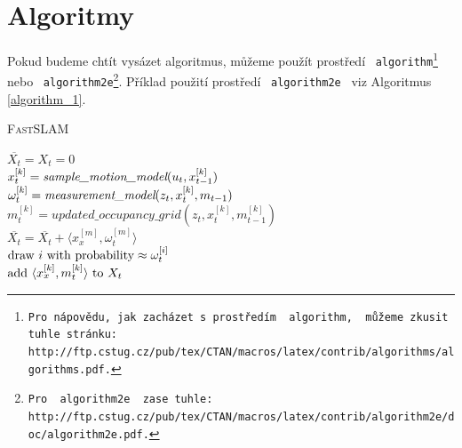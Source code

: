 \documentclass[czech,a4paper,11pt]{article}
\begin{document}
\section{Algoritmy} \label{algoritmus}
Pokud budeme chtít vysázet algoritmus, můžeme použít prostředí \ \texttt{algorithm\footnote{Pro nápovědu, jak zacházet s prostředím \ \texttt{algorithm,} \ můžeme zkusit tuhle 
stránku:\\http://ftp.cstug.cz/pub/tex/CTAN/macros/latex/contrib/algorithms/algorithms.pdf.} } 
nebo \ \texttt{algorithm2e\footnote{Pro \ \texttt{algorithm2e} \ zase tuhle: http://ftp.cstug.cz/pub/tex/CTAN/macros/latex/contrib/algorithm2e/doc/algorithm2e.pdf.}}.
Příklad použití prostředí \ \texttt{algorithm2e} \ viz Algoritmus \ref{algorithm_1}. 
\medskip
\begin{algorithm}[h]
\label{algorithm_1}
\caption{\textsc{Fast}SLAM}
\SetNlSty{}{}{:}
\SetInd{1em}{1em}
\SetNlSkip{-1.2em}
\Indp \Indp 
\BlankLine
$\overline{X_t} = X_t = 0$\\
{
	$x^{[k]}_{t} = \emph{sample\_motion\_model}(u_t ,x^{[k]}_{t-1})$\\
	$\omega^{[k]}_{t} = \emph{measurement\_model}(z_t ,x^{[k]}_{t}, m_{t-1})$\\
	$m^{[k]}_{t} = {updated\_occupancy\_grid}(z_t ,x^{[k]}_{t}, m_{t-1}^{[k]})$\\
	$\overline{X_t} = \overline{X_t} + \langle x^{[m]}_{x}, \omega^{[m]}_{t} \rangle$\\
}
{
	$\textnormal{draw } i \textnormal{ with probability} \approx \omega^{[i]}_{t}$\\
	$\textnormal{add } \langle x^{[k]}_{x}, m^{[k]}_{t} \rangle \textnormal{ to } X_t$\\
}
\end{algorithm}
\end{document}
